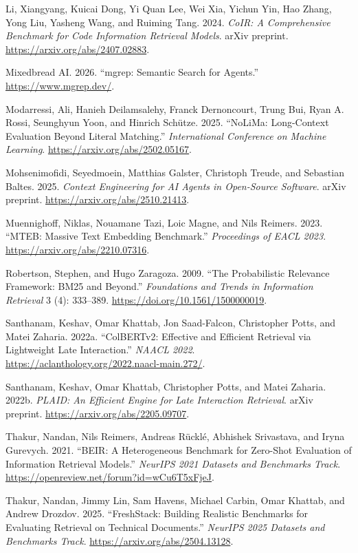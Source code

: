 \documentclass[
  11pt,
  letterpaper,
  numbers=noendperiod,
  parskip=half]{scrartcl}
\newlength{\cslhangindent}
\newenvironment{CSLReferences}[2] %
 {\begin{list}{}{%
  \setlength{\itemindent}{0pt}
  \setlength{\leftmargin}{0pt}
  \setlength{\parsep}{0pt}
  \ifodd #1
   \setlength{\leftmargin}{\cslhangindent}
   \setlength{\itemindent}{-1\cslhangindent}
  \fi
  \setlength{\itemsep}{#2\baselineskip}}}
 {\end{list}}
\begin{document}
\begin{CSLReferences}{1}{1}
Li, Xiangyang, Kuicai Dong, Yi Quan Lee, Wei Xia, Yichun Yin, Hao Zhang,
Yong Liu, Yasheng Wang, and Ruiming Tang. 2024. \emph{{CoIR}: A
Comprehensive Benchmark for Code Information Retrieval Models}. arXiv
preprint. \url{https://arxiv.org/abs/2407.02883}.

Mixedbread AI. 2026. {``mgrep: Semantic Search for Agents.''}
\url{https://www.mgrep.dev/}.

Modarressi, Ali, Hanieh Deilamsalehy, Franck Dernoncourt, Trung Bui,
Ryan A. Rossi, Seunghyun Yoon, and Hinrich Schütze. 2025.
{``NoLiMa: Long-Context Evaluation Beyond Literal Matching.''}
\emph{International Conference on Machine Learning}.
\url{https://arxiv.org/abs/2502.05167}.

Mohsenimofidi, Seyedmoein, Matthias Galster, Christoph Treude, and
Sebastian Baltes. 2025. \emph{Context Engineering for AI Agents in
Open-Source Software}. arXiv preprint.
\url{https://arxiv.org/abs/2510.21413}.

Muennighoff, Niklas, Nouamane Tazi, Loic Magne, and Nils Reimers. 2023.
{``{MTEB}: Massive Text Embedding Benchmark.''} \emph{Proceedings of
EACL 2023}. \url{https://arxiv.org/abs/2210.07316}.

Robertson, Stephen, and Hugo Zaragoza. 2009. {``The Probabilistic
Relevance Framework: {BM25} and Beyond.''} \emph{Foundations and Trends
in Information Retrieval} 3 (4): 333--389.
\url{https://doi.org/10.1561/1500000019}.

Santhanam, Keshav, Omar Khattab, Jon Saad-Falcon, Christopher Potts, and
Matei Zaharia. 2022a. {``{ColBERTv2}: Effective and Efficient Retrieval
via Lightweight Late Interaction.''} \emph{NAACL 2022}.
\url{https://aclanthology.org/2022.naacl-main.272/}.

Santhanam, Keshav, Omar Khattab, Christopher Potts, and Matei Zaharia.
2022b. \emph{{PLAID}: An Efficient Engine for Late Interaction
Retrieval}. arXiv preprint. \url{https://arxiv.org/abs/2205.09707}.

Thakur, Nandan, Nils Reimers, Andreas Rücklé, Abhishek Srivastava, and
Iryna Gurevych. 2021. {``{BEIR}: A Heterogeneous Benchmark for
Zero-Shot Evaluation of Information Retrieval Models.''} \emph{NeurIPS
2021 Datasets and Benchmarks Track}.
\url{https://openreview.net/forum?id=wCu6T5xFjeJ}.

Thakur, Nandan, Jimmy Lin, Sam Havens, Michael Carbin, Omar Khattab, and
Andrew Drozdov. 2025. {``FreshStack: Building Realistic Benchmarks for
Evaluating Retrieval on Technical Documents.''} \emph{NeurIPS 2025
Datasets and Benchmarks Track}. \url{https://arxiv.org/abs/2504.13128}.

\end{CSLReferences}
\end{document}
